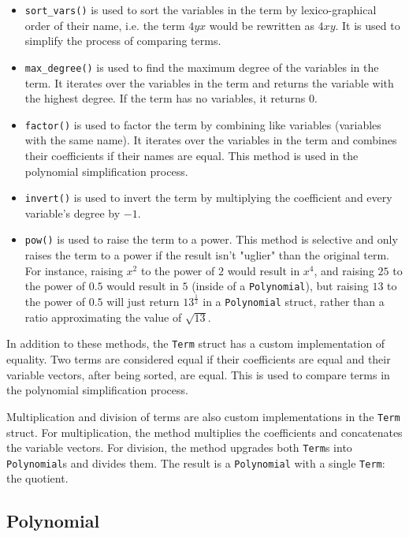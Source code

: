 \begin{itemize}
    \item \verb|sort_vars()| is used to sort the variables in the term by lexico-graphical order of their name, i.e. the term $4yx$ would be rewritten as $4xy$. It is used to simplify the process of comparing terms.
    \item \verb|max_degree()| is used to find the maximum degree of the variables in the term. It iterates over the variables in the term and returns the variable with the highest degree. If the term has no variables, it returns $0$.
    \item \verb|factor()| is used to factor the term by combining like variables (variables with the same name). It iterates over the variables in the term and combines their coefficients if their names are equal. This method is used in the polynomial simplification process.
    \item \verb|invert()| is used to invert the term by multiplying the coefficient and every variable's degree by $-1$.
    \item \verb|pow()| is used to raise the term to a power. This method is selective and only raises the term to a power if the result isn't "uglier" than the original term. For instance, raising $x^2$ to the power of $2$ would result in $x^4$, and raising $25$ to the power of $0.5$ would result in $5$ (inside of a \verb|Polynomial|), but raising $13$ to the power of $0.5$ will just return $13^{\frac{1}{2}}$ in a \verb|Polynomial| struct, rather than a ratio approximating the value of $\sqrt{13}$.
\end{itemize}

In addition to these methods, the \verb|Term| struct has a custom implementation of equality. Two terms are considered equal if their coefficients are equal and their variable vectors, after being sorted, are equal. This is used to compare terms in the polynomial simplification process.

Multiplication and division of terms are also custom implementations in the \verb|Term| struct. For multiplication, the method multiplies the coefficients and concatenates the variable vectors. For division, the method upgrades both \verb|Term|s into \verb|Polynomial|s and divides them. The result is a \verb|Polynomial| with a single \verb|Term|: the quotient.

\subsection{Polynomial}\label{subsec:polynomial}

